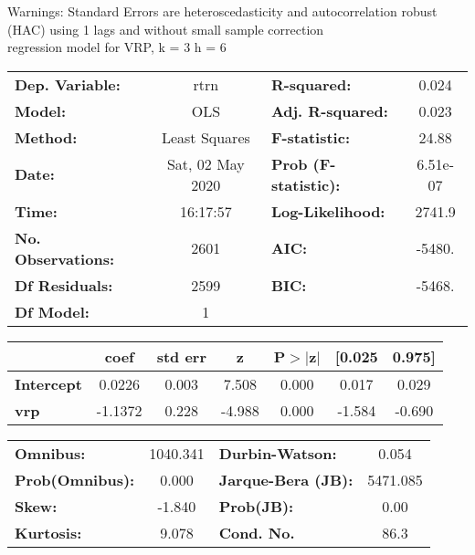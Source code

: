 Warnings: \newline
 [1] Standard Errors are heteroscedasticity and autocorrelation robust (HAC) using 1 lags and without small sample correction\\ 

regression model for VRP, k = 3 h = 6\begin{center}
\begin{tabular}{lclc}
\toprule
\textbf{Dep. Variable:}    &       rtrn       & \textbf{  R-squared:         } &     0.024   \\
\textbf{Model:}            &       OLS        & \textbf{  Adj. R-squared:    } &     0.023   \\
\textbf{Method:}           &  Least Squares   & \textbf{  F-statistic:       } &     24.88   \\
\textbf{Date:}             & Sat, 02 May 2020 & \textbf{  Prob (F-statistic):} &  6.51e-07   \\
\textbf{Time:}             &     16:17:57     & \textbf{  Log-Likelihood:    } &    2741.9   \\
\textbf{No. Observations:} &        2601      & \textbf{  AIC:               } &    -5480.   \\
\textbf{Df Residuals:}     &        2599      & \textbf{  BIC:               } &    -5468.   \\
\textbf{Df Model:}         &           1      & \textbf{                     } &             \\
\bottomrule
\end{tabular}
\begin{tabular}{lcccccc}
                   & \textbf{coef} & \textbf{std err} & \textbf{z} & \textbf{P$> |$z$|$} & \textbf{[0.025} & \textbf{0.975]}  \\
\midrule
\textbf{Intercept} &       0.0226  &        0.003     &     7.508  &         0.000        &        0.017    &        0.029     \\
\textbf{vrp}       &      -1.1372  &        0.228     &    -4.988  &         0.000        &       -1.584    &       -0.690     \\
\bottomrule
\end{tabular}
\begin{tabular}{lclc}
\textbf{Omnibus:}       & 1040.341 & \textbf{  Durbin-Watson:     } &    0.054  \\
\textbf{Prob(Omnibus):} &   0.000  & \textbf{  Jarque-Bera (JB):  } & 5471.085  \\
\textbf{Skew:}          &  -1.840  & \textbf{  Prob(JB):          } &     0.00  \\
\textbf{Kurtosis:}      &   9.078  & \textbf{  Cond. No.          } &     86.3  \\
\bottomrule
\end{tabular}
\end{center}

